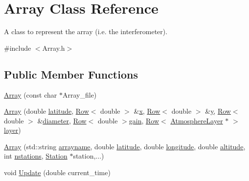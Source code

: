 \hypertarget{classArray}{
\section{Array Class Reference}
\label{classArray}
}


A class to represent the array (i.e. the interferometer).  




{\ttfamily \#include $<$Array.h$>$}

\subsection*{Public Member Functions}
\begin{DoxyCompactItemize}
\item 
\hyperlink{classArray_ab28022bcc92a1ae0f5676f0dcd22eb1b}{Array} (const char $\ast$Array\_\-file)
\item 
\hyperlink{classArray_af9101fdd8b76720362cc5aa867580c24}{Array} (double \hyperlink{classArray_a3d0a097d6c7d27ab0ba7b72a9b2223e1}{latitude}, \hyperlink{classRow}{Row}$<$ double $>$ \&\hyperlink{classArray_a378cb85324a4809cd3028668991044ae}{x}, \hyperlink{classRow}{Row}$<$ double $>$ \&\hyperlink{classArray_a2e59fb2a839ee2f10d5264e9624d9239}{y}, \hyperlink{classRow}{Row}$<$ double $>$ \&\hyperlink{classArray_a4aa89a5ce6246c1b79c2c5c9c7bdc398}{diameter}, \hyperlink{classRow}{Row}$<$ double $>$\hyperlink{classArray_ace0fa383a1da1684b91e268beaf41ece}{gain}, \hyperlink{classRow}{Row}$<$ \hyperlink{classAtmosphereLayer}{AtmosphereLayer} $\ast$ $>$\hyperlink{classArray_a8b777c1aa4eac3ce7687da64da7cc958}{layer})
\item 
\hyperlink{classArray_a63701bee30e516b38e6acb3449f6ce7f}{Array} (std::string \hyperlink{classArray_a12eb22fefdce3d4ae71d0340717c293a}{arrayname}, double \hyperlink{classArray_a3d0a097d6c7d27ab0ba7b72a9b2223e1}{latitude}, double \hyperlink{classArray_a7b0af12d6151bd9bb25e91145b79fb74}{longitude}, double \hyperlink{classArray_a07662f84d93f59a30c9312b6b546ee39}{altitude}, int \hyperlink{classArray_a972b05d3cedaf0c1997548c9dc573cd3}{nstations}, \hyperlink{classStation}{Station} $\ast$station,...)
\item 
void \hyperlink{classArray_a3fee2819664f2165c8e92e74bb7067fd}{Update} (double current\_\-time)
\end{DoxyCompactItemize}
